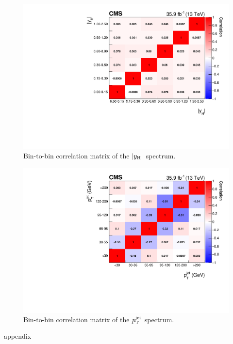 \begin{figure}[hbtp]
  \begin{center}
    \includegraphics[width=0.49\linewidth]{img/differentials/appendix/corrmat_rapidity.pdf}
    \caption{
        Bin-to-bin correlation matrix of the $\left|y_\mathrm{H}\right| $ spectrum.
        }
    \label{fig:corrMat_absy}
  \end{center}
\end{figure}

\begin{figure}[hbtp]
  \begin{center}
    \includegraphics[width=0.49\linewidth]{img/differentials/appendix/corrmat_ptjet.pdf}
    \caption{
        Bin-to-bin correlation matrix of the $p_\mathrm{T}^\text{jet} $ spectrum.
        }
    \label{fig:corrMat_ptjet}
  \end{center}
\end{figure}

{appendix}
